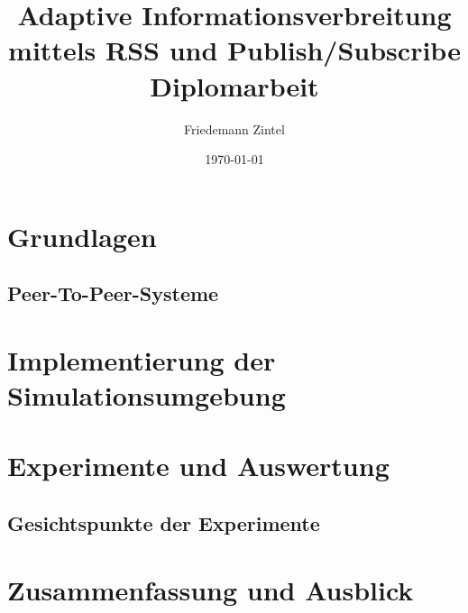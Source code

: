 \documentclass{scrbook}
\title{Adaptive Informationsverbreitung mittels RSS und Publish/Subscribe \\[2cm]\textnormal{Diplomarbeit}}
\author{Friedemann Zintel}
\date{\today}
\begin{document}

\maketitle


%

\frontmatter

\setcounter{tocdepth}{3}
\tableofcontents
\listoffigures

\mainmatter


\chapter{Grundlagen}

\section{Peer-To-Peer-Systeme}


\chapter{Implementierung der Simulationsumgebung}
\chapter{Experimente und Auswertung}
\section{Gesichtspunkte der Experimente}
\chapter{Zusammenfassung und Ausblick}

\backmatter




\end{document}
